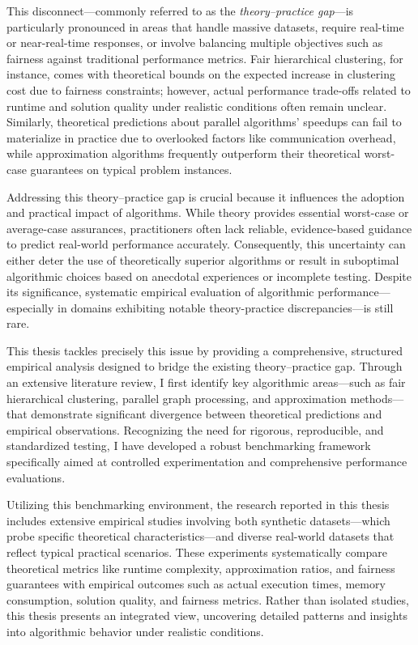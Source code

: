 \documentclass[12pt,twoside]{reedthesis}
\begin{document}
This disconnect—commonly referred to as the \emph{theory–practice
gap}—is particularly pronounced in areas that handle massive
datasets, require real-time or near-real-time responses, or involve
balancing multiple objectives such as fairness against traditional
performance metrics. Fair hierarchical clustering, for instance,
comes with theoretical bounds on the expected increase in clustering
cost due to fairness constraints; however, actual performance
trade-offs related to runtime and solution quality under realistic
conditions often remain unclear. Similarly, theoretical predictions
about parallel algorithms’ speedups can fail to materialize in
practice due to overlooked factors like communication overhead, while
approximation algorithms frequently outperform their theoretical
worst-case guarantees on typical problem instances.

Addressing this theory–practice gap is crucial because it influences
the adoption and practical impact of algorithms. While theory
provides essential worst-case or average-case assurances,
practitioners often lack reliable, evidence-based guidance to predict
real-world performance accurately. Consequently, this uncertainty can
either deter the use of theoretically superior algorithms or result
in suboptimal algorithmic choices based on anecdotal experiences or
incomplete testing. Despite its significance, systematic empirical
evaluation of algorithmic performance—especially in domains
exhibiting notable theory-practice discrepancies—is still rare.

This thesis tackles precisely this issue by providing a
comprehensive, structured empirical analysis designed to bridge the
existing theory–practice gap. Through an extensive literature review,
I first identify key algorithmic areas—such as fair hierarchical
clustering, parallel graph processing, and approximation methods—that
demonstrate significant divergence between theoretical predictions
and empirical observations. Recognizing the need for rigorous,
reproducible, and standardized testing, I have developed a robust
benchmarking framework specifically aimed at controlled
experimentation and comprehensive performance evaluations.

Utilizing this benchmarking environment, the research reported in
this thesis includes extensive empirical studies involving both
synthetic datasets—which probe specific theoretical
characteristics—and diverse real-world datasets that reflect typical
practical scenarios. These experiments systematically compare
theoretical metrics like runtime complexity, approximation ratios,
and fairness guarantees with empirical outcomes such as actual
execution times, memory consumption, solution quality, and fairness
metrics. Rather than isolated studies, this thesis presents an
integrated view, uncovering detailed patterns and insights into
algorithmic behavior under realistic conditions.
\end{document}
